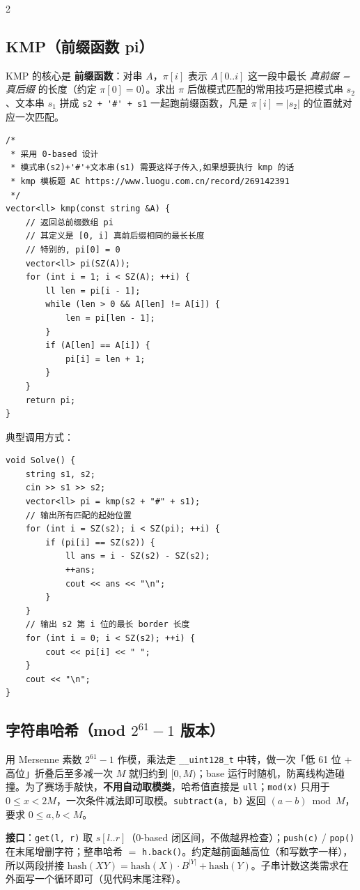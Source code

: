 \begin{multicols*}{2}
		\subsection{KMP（前缀函数 pi）}

		KMP 的核心是 \textbf{前缀函数}：对串 $A$，$\pi[i]$ 表示 $A[0..i]$ 这一段中最长 \emph{真前缀 = 真后缀} 的长度（约定 $\pi[0] = 0$）。求出 $\pi$ 后做模式匹配的常用技巧是把模式串 $s_2$、文本串 $s_1$ 拼成 \verb|s2 + '#' + s1| 一起跑前缀函数，凡是 $\pi[i] = |s_2|$ 的位置就对应一次匹配。

		\begin{verbatim}
/*
 * 采用 0-based 设计
 * 模式串(s2)+'#'+文本串(s1) 需要这样子传入,如果想要执行 kmp 的话
 * kmp 模板题 AC https://www.luogu.com.cn/record/269142391
 */
vector<ll> kmp(const string &A) {
	// 返回总前缀数组 pi
	// 其定义是 [0, i] 真前后缀相同的最长长度
	// 特别的, pi[0] = 0
	vector<ll> pi(SZ(A));
	for (int i = 1; i < SZ(A); ++i) {
		ll len = pi[i - 1];
		while (len > 0 && A[len] != A[i]) {
			len = pi[len - 1];
		}
		if (A[len] == A[i]) {
			pi[i] = len + 1;
		}
	}
	return pi;
}
		\end{verbatim}

		典型调用方式：

		\begin{verbatim}
void Solve() {
	string s1, s2;
	cin >> s1 >> s2;
	vector<ll> pi = kmp(s2 + "#" + s1);
	// 输出所有匹配的起始位置
	for (int i = SZ(s2); i < SZ(pi); ++i) {
		if (pi[i] == SZ(s2)) {
			ll ans = i - SZ(s2) - SZ(s2);
			++ans;
			cout << ans << "\n";
		}
	}
	// 输出 s2 第 i 位的最长 border 长度
	for (int i = 0; i < SZ(s2); ++i) {
		cout << pi[i] << " ";
	}
	cout << "\n";
}
		\end{verbatim}

		\subsection[\tochl{字符串哈希（mod $2^{61}-1$ 版本）}]{字符串哈希（mod $2^{61}-1$ 版本）}

		用 Mersenne 素数 $2^{61}-1$ 作模，乘法走 \verb|__uint128_t| 中转，做一次「低 61 位 + 高位」折叠后至多减一次 $M$ 就归约到 $[0, M)$；base 运行时随机，防离线构造碰撞。为了赛场手敲快，\textbf{不用自动取模类}，哈希值直接是 \verb|ull|；\verb|mod(x)| 只用于 $0 \le x < 2M$，一次条件减法即可取模。\verb|subtract(a, b)| 返回 $(a-b)\bmod M$，要求 $0 \le a,b < M$。

		\textbf{接口}：\verb|get(l, r)| 取 $s[l..r]$（0-based 闭区间，不做越界检查）；\verb|push(c)| / \verb|pop()| 在末尾增删字符；整串哈希 $=$ \verb|h.back()|。约定越前面越高位（和写数字一样），所以两段拼接 $\mathrm{hash}(XY) = \mathrm{hash}(X) \cdot B^{|Y|} + \mathrm{hash}(Y)$。子串计数这类需求在外面写一个循环即可（见代码末尾注释）。


\end{multicols*}
